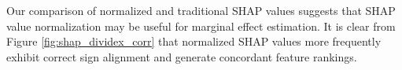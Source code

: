 \documentclass[mnsc,blindrev]{informs3}
\begin{document}
             Our comparison of normalized and traditional SHAP values suggests that SHAP value normalization may be useful for marginal effect estimation. It is clear from Figure \ref{fig:shap_dividex_corr} that normalized SHAP values more frequently exhibit correct sign alignment and generate concordant feature rankings. %
             
\end{document}
